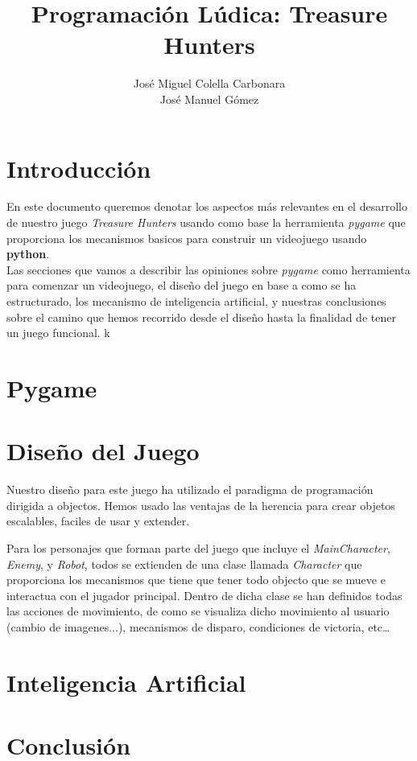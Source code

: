 \documentclass{article}
\title{Programación Lúdica: Treasure Hunters}
\author{José Miguel Colella Carbonara\\José Manuel Gómez}
\begin{document}
\maketitle

\section{Introducción}

En este documento queremos denotar los aspectos más relevantes en el desarrollo
de nuestro juego \emph{Treasure Hunters} usando como base la herramienta \textit{pygame}
que proporciona los mecanismos basicos para construir un videojuego usando \textbf{python}. \hfill \\

Las secciones que vamos a describir las opiniones sobre \textit{pygame} como herramienta
para comenzar un videojuego, el diseño del juego en base a como se ha estructurado, los mecanismo
de inteligencia artificial, y nuestras conclusiones sobre el camino que hemos recorrido desde el diseño
hasta la finalidad de tener un juego funcional.
k

\section{Pygame}



\section{Diseño del Juego}



Nuestro diseño para este juego ha utilizado el paradigma de programación dirigida
a objectos. Hemos usado las ventajas de la herencia para crear objetos escalables, faciles
de usar y extender.

Para los personajes que forman parte del juego que incluye el \textit{MainCharacter},
\textit{Enemy}, y \textit{Robot}, todos se extienden de una clase llamada \textit{Character}
que proporciona los mecanismos que tiene que tener todo objecto que se mueve e interactua
con el jugador principal. Dentro de dicha clase se han definidos todas las acciones de movimiento,
de como se visualiza dicho movimiento al usuario (cambio de imagenes...), mecanismos de disparo,
condiciones de victoria, etc\ldots


\section{Inteligencia Artificial}



\section{Conclusión}
\end{document}

